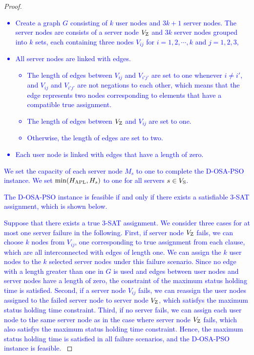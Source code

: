 \documentclass[10pt, letterpaper]{IEEEtran}
\newcommand\blue[1]{\textcolor{blue}{#1}}
\begin{document}
\begin{CJK}{UTF8}{ipxm}
\begin{proof}
  \blue{
  \begin{itemize}
    \item Create a graph $G$ consisting of $k$ user nodes and $3k+1$ server nodes. The server nodes are consists of a server node $V_{\rm Z}$ and $3k$ server nodes grouped into $k$ sets, each containing three nodes $V_{ij}$ for $i = 1, 2, \cdots, k$ and $j = 1, 2, 3$, 
    \item All server nodes are linked with edges.
    \begin{itemize}
      \item The length of edges between $V_{ij}$ and $V_{i'j'}$ are set to one whenever $i \neq i'$, and $V_{ij}$ and $V_{i'j'}$ are not negations to each other, which means that the edge represents two nodes corresponding to elements that have a compatible true assignment.
      \item The length of edges between $V_{\rm Z}$ and $V_{ij}$ are set to one.
      \item Otherwise, the length of edges are set to two.
    \end{itemize}
    \item Each user node is linked with edges that have a length of zero.
  \end{itemize}
  }

  \blue{
  We set the capacity of each server node $M_s$ to one to complete the D-OSA-PSO instance.
  We set $\min(H_{\rm APL},H_s)$ to one for all servers $s \in V_{\rm{S}}$.
  }

  \blue{
  The D-OSA-PSO instance is feasible if and only if there exists a satisfiable 3-SAT assignment, which is shown below.
  }

  \blue{
  Suppose that there exists a true 3-SAT assignment. 
  We consider three cases for at most one server failure in the following.
  First, if server node $V_{\rm Z}$ fails,
  we can choose $k$ nodes from $V_{ij}$, one corresponding to true assignment from each clause, which are all interconnected with edges of length one.
  We can assign the $k$ user nodes to the $k$ selected server nodes under this failure scenario.
  Since no edge with a length greater than one in $G$ is used and edges between user nodes and server nodes have a length of zero, the constraint of the maximum status holding time is satisfied.
  Second, if a server node $V_{ij}$ fails,
  we can reassign the user nodes assigned to the failed server node to server node $V_{\rm Z}$, which satisfys the maximum status holding time constraint.
  Third, if no server fails, 
  we can assign each user node to the same server node as in the case where server node $V_{\rm Z}$ fails, which also satisfys the maximum status holding time constraint.
  Hence, the maximum status holding time is satisfied in all failure scenarios, and the D-OSA-PSO instance is feasible.
  }


\end{proof}
\end{CJK}
\end{document}
